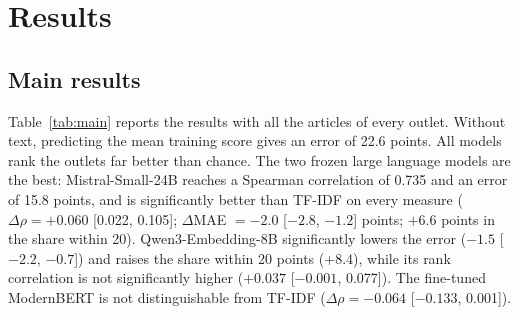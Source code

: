 \documentclass[11pt,a4paper]{article}
\begin{document}
\section{Results}\label{sec:results}

\subsection{Main results}
Table~\ref{tab:main} reports the results with all the articles of every outlet. Without text, predicting the mean
training score gives an error of 22.6 points. All models rank the outlets far better than chance. The two frozen large
language models are the best: Mistral-Small-24B reaches a Spearman correlation of 0.735 and an error of 15.8 points, and
is significantly better than TF-IDF on every measure ($\Delta\rho = +0.060$ [0.022, 0.105]; $\Delta$MAE $= -2.0$
[$-2.8$, $-1.2$] points; $+6.6$ points in the share within 20). Qwen3-Embedding-8B significantly lowers the error
($-1.5$ [$-2.2$, $-0.7$]) and raises the share within 20 points ($+8.4$), while its rank correlation is not
significantly higher ($+0.037$ [$-0.001$, 0.077]). The fine-tuned ModernBERT is not distinguishable from TF-IDF
($\Delta\rho = -0.064$ [$-0.133$, 0.001]).

\begin{table}[t]
\centering
\caption{Predicting the NewsGuard score of unseen outlets (226 outlets, all articles). 95\% bootstrap intervals in
brackets; $^\ast$: significantly better than TF-IDF (paired bootstrap).}\label{tab:main}
\end{table}
\end{document}

